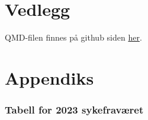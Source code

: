 \documentclass[
  12pt,
  a4paper,
  DIV=11,
  numbers=noendperiod]{scrartcl}
\begin{document}
\newpage

\section*{Vedlegg}\label{vedlegg}

QMD-filen finnes på github siden
\href{https://github.com/Danieljoha/SOK-2209/blob/main/kand_SOK2209_Bacheloroppgave_V25.qmd}{her}.

\section*{Appendiks}\label{appendiks}

\subsubsection{Tabell for 2023
sykefraværet}\label{tabell-for-2023-sykefravuxe6ret}
\end{document}
